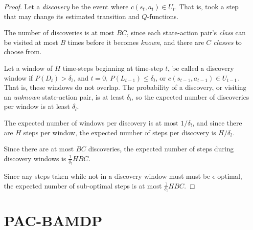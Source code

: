 \begin{proof}
Let a \emph{discovery} be the event where $c(s_t,a_t) \in U_t$. That is, \A took a step that may change its estimated transition and $Q$-functions.

The number of discoveries is at most $B C$, since each state-action pair's \emph{class} can be visited at most $B$ times before it becomes \emph{known}, and there are $C$ \emph{classes} to choose from.

Let a window of $H$ time-steps beginning at time-step $t$, be called a discovery window if $P(D_t) > \delta_l$, and $t=0$, $P(L_{t-1}) \leq \delta_l$, or $c(s_{t-1},a_{t-1}) \in U_{t-1}$. That is, these windows do not overlap. The probability of a discovery, or visiting an \emph{unknown} state-action pair, is at least $\delta_l$, so the expected number of discoveries per window is at least $\delta_l$.

The expected number of windows per discovery is at most $1/\delta_l$, and since there are $H$ steps per window, the expected number of steps per discovery is $H / \delta_l$.

Since there are at most $B C$ discoveries, the expected number of steps during discovery windows is $\frac 1 {\delta_l} H B C$.

Since any steps taken while not in a discovery window must must be $\epsilon$-optimal, the expected number of sub-optimal steps is at most $\frac 1 {\delta_l} H B C$.

\end{proof}

\section{PAC-BAMDP}

